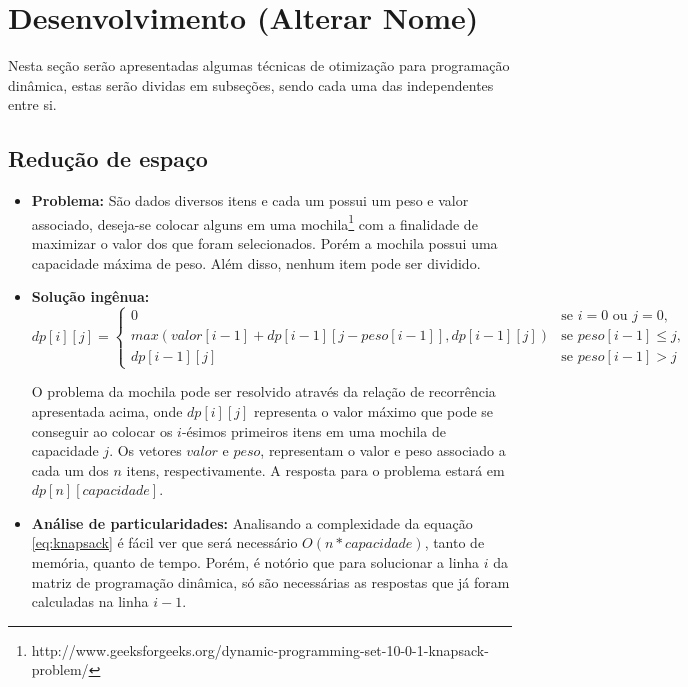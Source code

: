 \chapter{Desenvolvimento (Alterar Nome) }
\label{chap:desenvolvimento}

Nesta seção serão apresentadas algumas técnicas de otimização para programação dinâmica, estas serão dividas em subseções, sendo cada uma das independentes entre si.

\section{Redução de espaço}

\begin{itemize}
\item \textbf{Problema:}
 São dados diversos itens e cada um possui um peso e valor associado, deseja-se colocar alguns em uma mochila\footnote{http://www.geeksforgeeks.org/dynamic-programming-set-10-0-1-knapsack-problem/} com a finalidade de maximizar o valor dos que foram selecionados. Porém a mochila possui uma capacidade máxima de peso. Além disso, nenhum item pode ser dividido.
 \\
\item \textbf{Solução ingênua:} 
\begin{equation}
dp[i][j] = 
\begin{cases}
0 &\text{se } i = 0 \text{ ou } j = 0,\\
max(valor[i-1] + dp[i-1][j-peso[i-1]], dp[i-1][j]) &\text{se } peso[i-1] \leq{j},\\
dp[i-1][j] &\text{se } peso[i-1] > j
\end{cases}
\label{eq:knapsack}
\end{equation}

O problema da mochila pode ser resolvido através da relação de recorrência apresentada acima, onde $dp[i][j]$ representa o valor máximo que pode se conseguir ao colocar os $i$-ésimos primeiros itens em uma mochila de capacidade $j$. Os vetores $valor$ e $peso$, representam o valor e peso associado a cada um dos $n$ itens, respectivamente. A resposta para o problema estará em $dp[n][capacidade]$.


\item \textbf{Análise de particularidades:}
Analisando a complexidade da equação \ref{eq:knapsack} é fácil ver que será necessário $O(n*capacidade)$, tanto de memória, quanto de tempo. Porém, é notório que para solucionar a linha $i$ da matriz de programação dinâmica, só são necessárias as respostas que já foram calculadas na linha $i - 1$.



\end{itemize}
